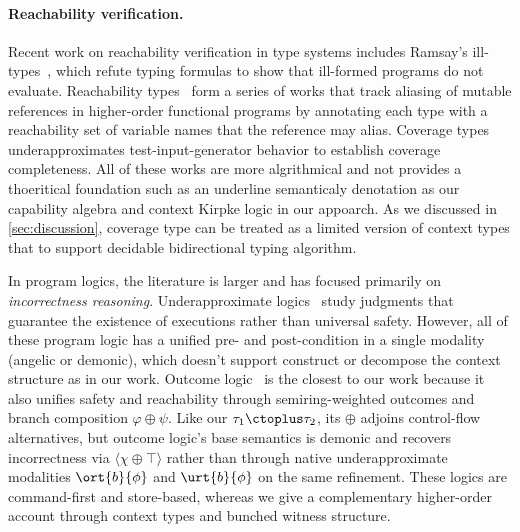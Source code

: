 \paragraph{Reachability verification.}
Recent work on reachability verification in type systems includes
Ramsay's ill-types~\cite{Ill-types,RamsayIncorType}, which refute
typing formulas to show that ill-formed programs do not evaluate. Reachability types~\cite{ReachabilityTypes,ReachabilityTypesBidirectional,ReachabilityTypesTypestate,ReachabilityTypesLifetimes,ReachabilityTypesCyclic,ReachabilityTypesLogicalRelations,ReachabilityTypesPolymorphic} form a series of works that track aliasing of mutable references in higher-order functional programs by annotating each type with a reachability set of variable names that the reference may alias.
Coverage types~\cite{CoverageType} underapproximates
test-input-generator behavior to establish coverage completeness.
All of these works are more algrithmical and not provides a thoeritical foundation such as an underline semanticaly denotation as our capability algebra and context Kirpke logic in our appoarch. As we discussed in \autoref{sec:discussion}, coverage type can be treated as a limited version of context types that to support decidable bidirectional typing algorithm.

In program logics, the literature is larger and has focused primarily
on \emph{incorrectness reasoning}.
Underapproximate logics~\cite{OHP19,RBD+20,ReverseHoareLogic,
HyperHoareLogic,QuantitativeWeakestHyperPre,UTurn,BackwardIncorrectness}
study judgments that guarantee the existence of executions rather than
universal safety.
However, all of these program logic has a unified pre- and post-condition in a single modality (angelic or demonic), which doesn't support construct or decompose the context structure as in our work.
Outcome logic~\cite{ZDS23,Zil25TOPLAS} is the closest to our work
because it also unifies safety and reachability through semiring-weighted
outcomes and branch composition $\varphi \oplus \psi$.
Like our $\tau_1 \ctoplus \tau_2$, its $\oplus$ adjoins control-flow
alternatives, but outcome logic's base semantics is demonic and
recovers incorrectness via $\langle \chi \oplus \top \rangle$ rather
than through native underapproximate modalities $\ort{b}{\phi}$ and
$\urt{b}{\phi}$ on the same refinement.
These logics are command-first and store-based, whereas we give a
complementary higher-order account through context types and bunched
witness structure.


